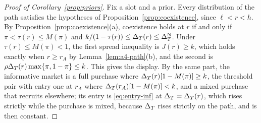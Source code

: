 \begin{proof}[Proof of Corollary~\ref{prop:priors}]
Fix a slot and a prior. Every distribution of the path satisfies the hypotheses of Proposition~\ref{prop:coexistence}, since
\(\ell<r<h\). By Proposition~\ref{prop:coexistence}(a), coexistence holds at \(r\) if and only if
\(\pi<\tau(r)\le M(\pi)\) and \(k/(1-\tau(r))\le\Delta_T(r)\le\Delta_T^{\rm N}\). Under \(\tau(r)\le M(\pi)<1\), the first spread
inequality is \(J(r)\ge k\), which holds exactly when \(r\ge r_A\) by Lemma~\ref{lem:a4-path}(b), and the second is
\(\rho\Delta_T(r)\max\{\pi,1-\pi\}\le k\). This gives the display. By the same part, the informative market is a full
purchase where \(\Delta_T(r)[1-M(\pi)]\ge k\), the threshold pair with entry one at \(r_A\) where
\(\Delta_T(r_A)[1-M(\pi)]<k\), and a mixed purchase that recruits elsewhere; its entry is \eqref{eq:entry-inf} at
\(\Delta_T=\Delta_T(r)\), which rises strictly while the purchase is mixed, because \(\Delta_T\) rises strictly on the path, and is then
constant.


\end{proof}
